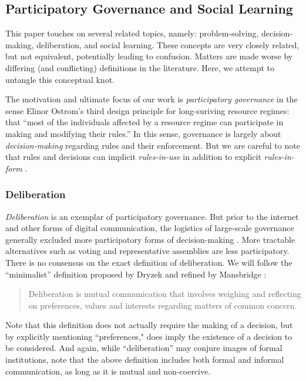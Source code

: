 \documentclass[manuscript,screen,review,acmsmall]{acmart}
\begin{document}
\subsection{Participatory Governance and Social Learning}
This paper touches on several related topics, namely: problem-solving, decision-making, deliberation, and social learning.
These concepts are very closely related, but not equivalent,
potentially leading to confusion.
Matters are made worse by differing (and conflicting) definitions in the literature.
Here, we attempt to untangle this conceptual knot.

The motivation and ultimate focus of our work is {\em participatory governance}
in the sense Elinor Ostrom's third design principle for long-suriving resource regimes: that ``most of the individuals affected by a resource
regime can participate in making and modifying their rules.''
\cite{ostrom_collective_2000}
In this sense, governance is largely about {\em decision-making} regarding
rules and their enforcement.
But we are careful to note that rules and decisions can implicit
{\em rules-in-use} in addition to explicit {\em rules-in-form}
\cite{hess_framework_2005, keegan_evolution_2017}.

\subsubsection{Deliberation}
{\em Deliberation} is an exemplar of participatory governance.
But prior to the internet and other forms of digital communication,
the logistics of large-scale governance generally excluded more participatory
forms of decision-making \cite{ackerman_deliberation_2002}.
More tractable alternatives such as voting and representative
assemblies are less participatory.
There is no consensus on the exact definition of deliberation.
We will follow the ``minimalist'' definition proposed by Dryzek
\cite{dryzek_deliberative_2002} and refined by Mansbridge \cite{mansbridge_minimalist_2015}:
\begin{quote}
Deliberation is mutual communication that involves weighing and reflecting on preferences, values and interests regarding matters of common concern.
\end{quote}
Note that this definition does not actually require the making of a decision, but by explicitly mentioning ``preferences," does imply the existence of a decision to be considered.
And again, while ``deliberation'' may conjure images of formal institutions,
note that the above definition includes both formal and informal communication,
as long as it is mutual and non-coercive.
\end{document}
